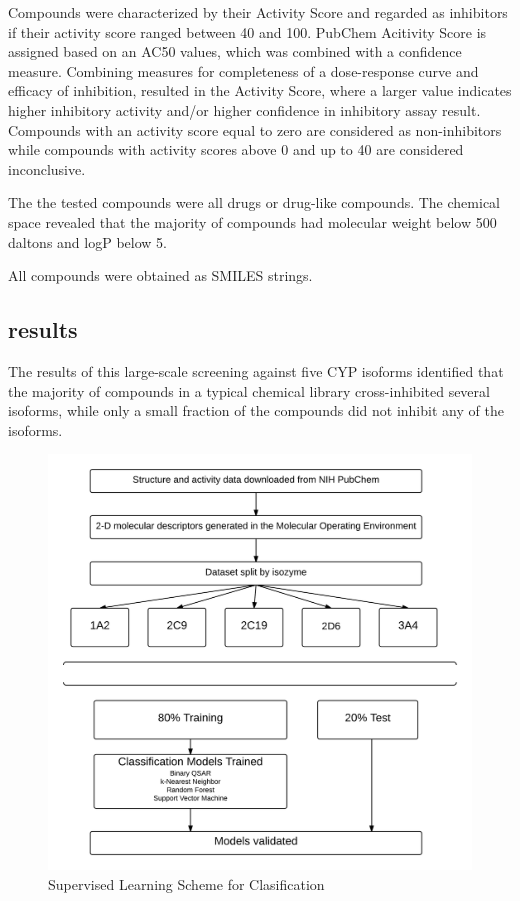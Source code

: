 Compounds were characterized by their Activity Score and regarded as inhibitors if their activity score ranged between 40 and 100. PubChem Acitivity Score is assigned based on an AC50 values, which was combined with a confidence measure. Combining measures for completeness of a dose-response curve and efficacy of inhibition, resulted in the Activity Score, where a larger value indicates higher inhibitory activity and/or higher confidence in inhibitory assay result. Compounds with an activity score equal to zero are considered as non-inhibitors while compounds with activity scores above 0 and up to 40 are considered inconclusive. \cite{Lapins2013}

The the tested compounds were all drugs or drug-like compounds. The chemical space revealed that the majority of compounds had molecular weight below 500 daltons and logP below 5. \cite{Lapins2013}

All compounds were obtained as SMILES strings.

\subsection{results}
The results of this large-scale screening against five CYP isoforms identified that the majority of compounds in a typical chemical library cross-inhibited several isoforms, while only a small fraction of the compounds did not inhibit any of the isoforms. \cite{Veith2009}


\begin{figure}[!htp]
  \caption{Supervised Learning Scheme for Clasification}
  \centering
   \includegraphics[width=1\textwidth]{../img/Supervised_Workflow.png}
\end{figure}


